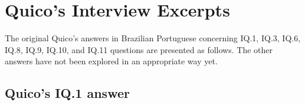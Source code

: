 \section{Quico’s Interview Excerpts}
\label{interview-exc-sec:quico}

The original Quico's answers in Brazilian Portuguese concerning 
 \gls{IQ}.1, 
 \gls{IQ}.3, 
\gls{IQ}.6, 
\gls{IQ}.8, 
\gls{IQ}.9, 
\gls{IQ}.10, and 
\gls{IQ}.11  
questions are presented as follows. The other answers have not been explored in an appropriate way yet.


 \subsection{Quico’s IQ.1 answer}
 \label{interview-exc-ss:quico-iq1}


